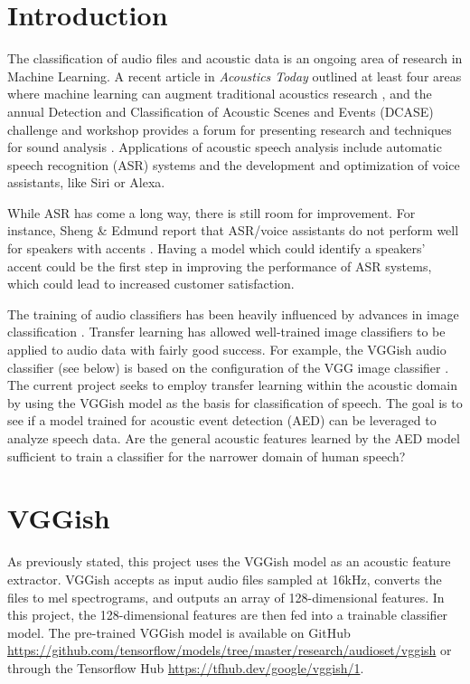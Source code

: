 \section{Introduction}

The classification of audio files and acoustic data is an ongoing area of research in Machine Learning. A recent article in \textit{Acoustics Today} outlined at least four areas where machine learning can augment traditional acoustics research \cite{AT}, and the annual Detection and Classification of Acoustic Scenes and Events (DCASE) challenge and workshop provides a forum for presenting research and techniques for sound analysis \cite{DCASE}. Applications of acoustic speech analysis include automatic speech recognition (ASR) systems and the development and optimization of voice assistants, like Siri or Alexa.

While ASR has come a long way, there is still room for improvement. For instance, Sheng \& Edmund report that ASR/voice assistants do not perform well for speakers with accents \cite{Sheng}. Having a model which could identify a speakers' accent could be the first step in improving the performance of ASR systems, which could lead to increased customer satisfaction.

The training of audio classifiers has been heavily influenced by advances in image classification \cite{Hershey}. Transfer learning has allowed well-trained image classifiers to be applied to audio data with fairly good success. For example, the VGGish audio classifier (see below) is based on the configuration of the VGG image classifier \cite{Hershey, VGG}. The current project seeks to employ transfer learning within the acoustic domain by using the VGGish model as the basis for classification of speech.  The goal is to see if a model trained for acoustic event detection (AED) can be leveraged to analyze speech data. Are the general acoustic features learned by the AED model sufficient to train a classifier for the narrower domain of human speech?
\section{VGGish}
As previously stated, this project uses the VGGish model as an acoustic feature extractor.  VGGish accepts as input audio files sampled at 16kHz, converts the files to mel spectrograms, and outputs an array of 128-dimensional features. In this project, the 128-dimensional features are then fed into a trainable classifier model. The pre-trained VGGish model is available on GitHub \url{https://github.com/tensorflow/models/tree/master/research/audioset/vggish} or through the Tensorflow Hub \url{https://tfhub.dev/google/vggish/1}.

